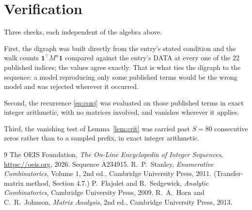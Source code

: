 \documentclass[11pt,a4paper]{article}
\theoremstyle{plain}
\theoremstyle{definition}
\begin{document}
\section{Verification}

Three checks, each independent of the algebra above.

First, the digraph was built directly from the entry's stated condition and the walk counts
$\mathbf{1}^{\!\top}M^{n}\mathbf{1}$ compared against the entry's DATA at every one of
the $22$ published indices; the values agree exactly. That is what ties the digraph to
the sequence: a model reproducing only some published terms would be the wrong model and
was rejected wherever it occurred.

Second, the recurrence \eqref{eq:conj} was evaluated on those published terms in exact
integer arithmetic, with no matrices involved, and vanishes wherever it applies.

Third, the vanishing test of Lemma~\ref{lem:crit} was carried past $S=80$ consecutive
zeros rather than to a sampled prefix, in exact integer arithmetic.

\begin{thebibliography}{9}
 The OEIS Foundation, \emph{The On-Line Encyclopedia of Integer
Sequences}, \url{https://oeis.org}, 2026. Sequence A234915.
 R.~P.~Stanley, \emph{Enumerative Combinatorics}, Volume 1, 2nd ed.,
Cambridge University Press, 2011. (Transfer-matrix method, Section 4.7.)
 P.~Flajolet and R.~Sedgewick, \emph{Analytic Combinatorics}, Cambridge
University Press, 2009.
 R.~A.~Horn and C.~R.~Johnson, \emph{Matrix Analysis}, 2nd ed., Cambridge
University Press, 2013.
\end{thebibliography}
\end{document}
